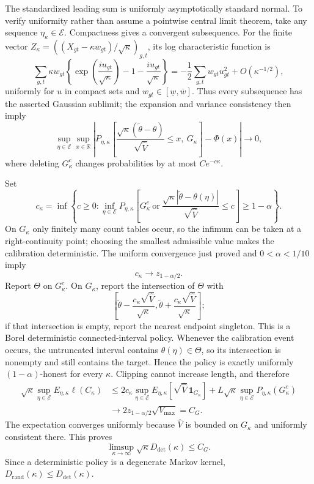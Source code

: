 The standardized leading sum is uniformly asymptotically standard normal.
To verify uniformity rather than assume a pointwise central limit theorem,
take any sequence \(\eta_\kappa\in\mathcal E\).  Compactness gives a
convergent subsequence.  For the finite vector
\(Z_\kappa=((X_{gt}-\kappa w_{gt})/\sqrt\kappa)_{g,t}\), its log
characteristic function is
\[
 \sum_{g,t}\kappa w_{gt}
 \left\{
   \exp\left(\frac{i u_{gt}}{\sqrt\kappa}\right)
       -1-\frac{i u_{gt}}{\sqrt\kappa}
 \right\}
 =-\frac12\sum_{g,t}w_{gt}u_{gt}^2+O(\kappa^{-1/2}),
\]
uniformly for \(u\) in compact sets and \(w_{gt}\in[\underline w,\overline w]\).
Thus every subsequence has the asserted Gaussian sublimit; the expansion
and variance consistency then imply
\[
 \sup_{\eta\in\mathcal E}\sup_{x\in\mathbb R}
 \left|
 P_{\eta,\kappa}\left[
  \frac{\sqrt\kappa(\widetilde\theta-\theta)}{\sqrt{\widehat V}}
       \leq x,\ G_\kappa
 \right]-\Phi(x)
 \right|\longrightarrow0,
\]
where deleting \(G_\kappa^c\) changes probabilities by at most
\(Ce^{-c\kappa}\).

Set
\[
 c_\kappa=\inf\left\{c\geq0:
  \inf_{\eta\in\mathcal E}P_{\eta,\kappa}\left[
   G_\kappa^c\ \text{or}\
   \frac{\sqrt\kappa|\widetilde\theta-\theta(\eta)|}{\sqrt{\widehat V}}
       \leq c
  \right]\geq1-\alpha
 \right\}.
\]
On \(G_\kappa\) only finitely many count tables occur, so the infimum can
be taken at a right-continuity point; choosing the smallest admissible
value makes the calibration deterministic.  The uniform convergence just
proved and \(0<\alpha<1/10\) imply
\[
 c_\kappa\longrightarrow z_{1-\alpha/2}.
\]
Report \(\Theta\) on \(G_\kappa^c\).  On \(G_\kappa\), report the
intersection of \(\Theta\) with
\[
 \left[\widetilde\theta-\frac{c_\kappa\sqrt{\widehat V}}{\sqrt\kappa},
       \widetilde\theta+\frac{c_\kappa\sqrt{\widehat V}}{\sqrt\kappa}
 \right];
\]
if that intersection is empty, report the nearest endpoint singleton.
This is a Borel deterministic connected-interval policy.  Whenever the
calibration event occurs, the untruncated interval contains
\(\theta(\eta)\in\Theta\), so its intersection is nonempty and still
contains the target.  Hence the policy is exactly uniformly
\((1-\alpha)\)-honest for every \(\kappa\).  Clipping cannot increase
length, and therefore
\[
 \begin{split}
 \sqrt\kappa\sup_{\eta\in\mathcal E}
 E_{\eta,\kappa}\ell(C_\kappa)
 &\leq
 2c_\kappa\sup_{\eta\in\mathcal E}
 E_{\eta,\kappa}\left[\sqrt{\widehat V}\,\mathbf 1_{G_\kappa}\right]
 +L\sqrt\kappa\sup_{\eta\in\mathcal E}P_{\eta,\kappa}(G_\kappa^c)\\
 &\longrightarrow 2z_{1-\alpha/2}\sqrt{V_{\max}}=C_G.
 \end{split}
\]
The expectation converges uniformly because \(\widehat V\) is bounded on
\(G_\kappa\) and uniformly consistent there.  This proves
\[
 \limsup_{\kappa\to\infty}\sqrt\kappa D_{\mathrm{det}}(\kappa)\leq C_G.
\]
Since a deterministic policy is a degenerate Markov kernel,
\(D_{\mathrm{rand}}(\kappa)\leq D_{\mathrm{det}}(\kappa)\).

